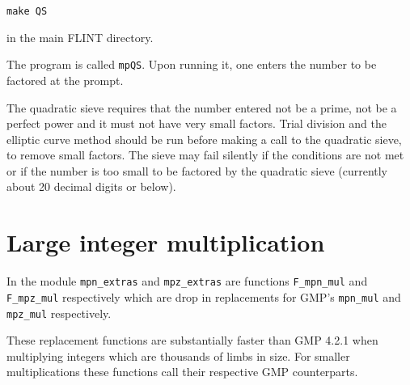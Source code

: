 \documentclass[a4paper,10pt]{article}
\newcommand{\code}{\lstinline}
\begin{document}
\code{make QS}

in the main FLINT directory.

The program is called \code{mpQS}. Upon running it, one enters the number to be factored at the prompt. 

The quadratic sieve requires that the number entered not be a prime, not be a perfect power and it must not have very small factors. Trial division and the elliptic curve method should be run before making a call to the quadratic sieve, to remove small factors. The sieve may fail silently if the conditions are not met or if the number is too small to be factored by the quadratic sieve (currently about 20 decimal digits or below).

\section{Large integer multiplication}
In the module \code{mpn_extras} and \code{mpz_extras} are functions \code{F_mpn_mul} and \code{F_mpz_mul} respectively which are drop in replacements for GMP's \code{mpn_mul} and \code{mpz_mul} respectively. 

These replacement functions are substantially faster than GMP 4.2.1 when multiplying integers which are thousands of limbs in size. For smaller multiplications these functions call their respective GMP counterparts.



\end{document}
